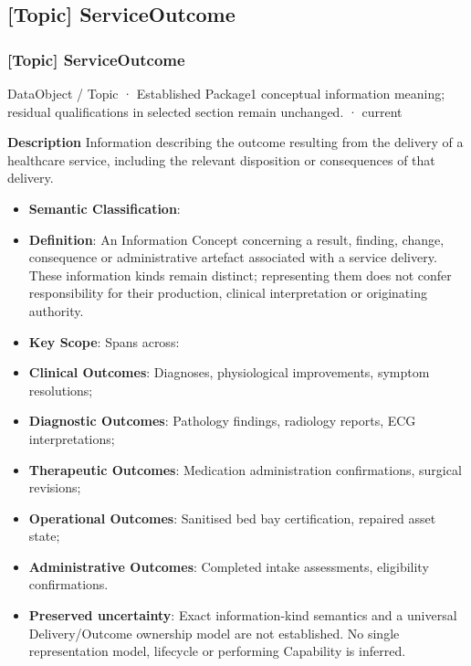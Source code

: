 \subsection{[Topic] ServiceOutcome}

\subsubsection{[Topic] ServiceOutcome}

\label{element:4fb589629e7f405db44d6a87a2b5e36b}
{\small DataObject / Topic · Established Package1 conceptual information meaning; residual qualifications in selected section remain unchanged. · current}\par

\textbf{Description}
Information describing the outcome resulting from the delivery of a healthcare service, including the relevant disposition or consequences of that delivery.



\begin{itemize}


\item \textbf{Semantic Classification}: \texttt{}

\item \textbf{Definition}: An Information Concept concerning a result, finding, change, consequence or administrative artefact associated with a service delivery. These information kinds remain distinct; representing them does not confer responsibility for their production, clinical interpretation or originating authority.

\item \textbf{Key Scope}: Spans across:

\item \textbf{Clinical Outcomes}: Diagnoses, physiological improvements, symptom resolutions;

\item \textbf{Diagnostic Outcomes}: Pathology findings, radiology reports, ECG interpretations;

\item \textbf{Therapeutic Outcomes}: Medication administration confirmations, surgical revisions;

\item \textbf{Operational Outcomes}: Sanitised bed bay certification, repaired asset state;

\item \textbf{Administrative Outcomes}: Completed intake assessments, eligibility confirmations.

\item \textbf{Preserved uncertainty}: Exact information-kind semantics and a universal Delivery/Outcome ownership model are not established. No single representation model, lifecycle or performing Capability is inferred.

\end{itemize}


